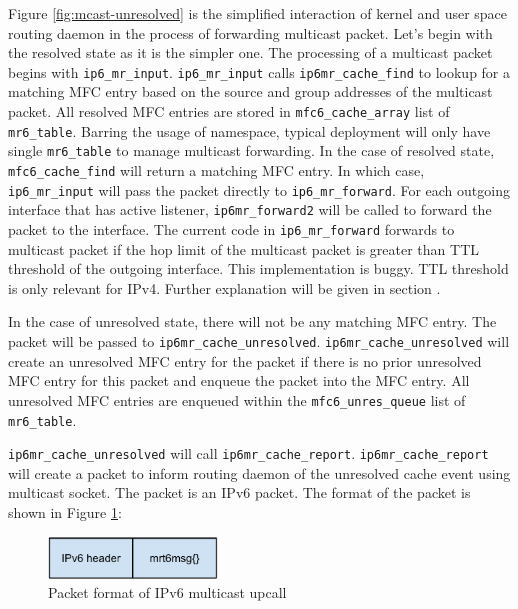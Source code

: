 \documentclass{article}
\begin{document}
Figure \ref{fig:mcast-unresolved} is the simplified interaction of kernel and
user space routing daemon in the process of forwarding multicast packet. Let's
begin with the resolved state as it is the simpler one. The processing of a
multicast packet begins with \texttt{ip6\_mr\_input}. \texttt{ip6\_mr\_input}
calls \texttt{ip6mr\_cache\_find} to lookup for a matching MFC entry based on
the source and group addresses of the multicast packet. All resolved MFC entries
are stored in \texttt{mfc6\_cache\_array} list of \texttt{mr6\_table}.  Barring
the usage of namespace, typical deployment will only have single
\texttt{mr6\_table} to manage multicast forwarding. In the case of resolved
state, \texttt{mfc6\_cache\_find} will return a matching MFC entry. In which
case, \texttt{ip6\_mr\_input} will pass the packet directly to
\texttt{ip6\_mr\_forward}. For each outgoing interface that has active listener,
\texttt{ip6mr\_forward2} will be called to forward the packet to the interface.
The current code in \texttt{ip6\_mr\_forward} forwards to multicast packet if the
hop limit of the multicast packet is greater than TTL threshold of the outgoing
interface. This implementation is buggy. TTL threshold is only relevant for
IPv4. Further explanation will be given in section
\label{sec:multicast-interface}.

In the case of unresolved state, there will not be any matching MFC entry. The
packet will be passed to \texttt{ip6mr\_cache\_unresolved}.
\texttt{ip6mr\_cache\_unresolved} will create an unresolved MFC entry for the
packet if there is no prior unresolved MFC entry for this packet and enqueue the
packet into the MFC entry. All unresolved MFC entries are enqueued within the
\texttt{mfc6\_unres\_queue} list of \texttt{mr6\_table}.


\texttt{ip6mr\_cache\_unresolved} will call \texttt{ip6mr\_cache\_report}.
\texttt{ip6mr\_cache\_report} will create a packet to inform routing daemon of
the unresolved cache event using multicast socket. The packet is an IPv6 packet.
The format of the packet is shown in Figure \ref{fig:mcast-upcall}:

\begin{figure}[h]
  \begin{center}
    \includegraphics[width=0.4\textwidth]{mcast-upcall}
    \caption{Packet format of IPv6 multicast upcall}
    \label{fig:mcast-upcall}
  \end{center}
\end{figure}
\end{document}

